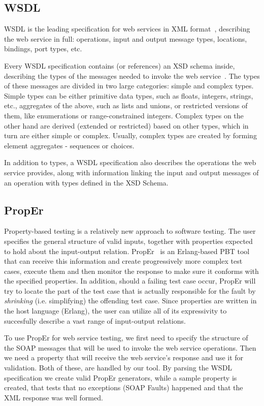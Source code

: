 \documentclass[submission,copyright]{eptcs}
\begin{document}
\subsection{WSDL}

WSDL is the leading specification for web services in XML
format~\cite{wsdl_spec}, describing the web service in full:
operations, input and output message types, locations, bindings, port
types, etc.

Every WSDL specification contains (or references) an XSD schema
inside, describing the types of the messages needed to invoke the web
service~\cite{xsd_structure_spec,xsd_datatypes_spec}. The types of
these messages are divided in two large categories: simple and complex
types. Simple types can be either primitive data types, such as
floats, integers, strings, etc., aggregates of the above, such as
lists and unions, or restricted versions of them, like enumerations or
range-constrained integers. Complex types on the other hand are
derived (extended or restricted) based on other types, which in turn
are either simple or complex. Usually, complex types are created by
forming element aggregates - sequences or choices.

In addition to types, a WSDL specification also describes the
operations the web service provides, along with information linking
the input and output messages of an operation with types defined in
the XSD Schema.

\subsection{PropEr}

Property-based testing is a relatively new approach to software
testing. The user specifies the general structure of valid inputs,
together with properties expected to hold about the input-output
relation. PropEr~\cite{proper_tool} is an Erlang-based PBT tool that
can receive this information and create progressively more complex
test cases, execute them and then monitor the response to make sure it
conforms with the specified properties. In addition, should a failing
test case occur, PropEr will try to locate the part of the test case
that is actually responsible for the fault by \emph{shrinking} (i.e.
simplifying) the offending test case. Since properties are written in
the host language (Erlang), the user can utilize all of its
expressivity to succesfully describe a vast range of input-output
relations.

To use PropEr for web service testing, we first need to specify the structure
of the SOAP messages that will be used to invoke the web service operations. 
Then we need a property that will receive the web service's response and use 
it for validation. Both of these, are handled by our tool. By parsing the 
WSDL specification we create valid PropEr generators, while a sample property
is created, that tests that no exceptions (SOAP Faults) happened and that the 
XML response was well formed.
\end{document}
